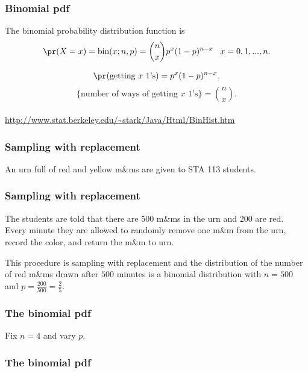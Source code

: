 \begin{frame}[fragile]\frametitle{Binomial pdf}

\begin{thm}
The binomial probability distribution function is
$$\pr(X=x) = \mbox{bin}(x;n,p) = \binom{n}{x} p^x (1-p)^{n-x} \, \, \, \, \, x=0,1,...,n.$$ 
\end{thm}

$$\pr(\mbox{getting $x$ 1's}) = p^x (1-p)^{n-x}.$$ 
$$\{\mbox{number of ways of getting $x$ 1's}\} = \binom{n}{x}.$$ \\ 

\alert{\url{http://www.stat.berkeley.edu/~stark/Java/Html/BinHist.htm}}


\end{frame}


\begin{frame}[fragile]\frametitle{Sampling with replacement}

An urn full of red and yellow m\&ms are given to STA 113 students. 

\center{\texttt{[image: mm3]} }


\end{frame}



\begin{frame}[fragile]\frametitle{Sampling with replacement}

The students are told that there are $500$ m\&ms in the urn
and $200$ are red. \\ 
Every minute they are allowed to randomly remove one m\&m from the urn, record
the color, and return the m\&m to urn. \\  \vspace{.1in}

This procedure is sampling with replacement and the distribution of the
number of red m\&ms drawn after $500$ minutes is a binomial
distribution with $n=500$ and $p=\frac{200}{500} = \frac{2}{5}.$


\end{frame}


\begin{frame}[fragile]\frametitle{The binomial pdf}

Fix $n=4$ and vary $p$.

\end{frame}



\begin{frame}[fragile]\frametitle{The binomial pdf}


\end{frame}



